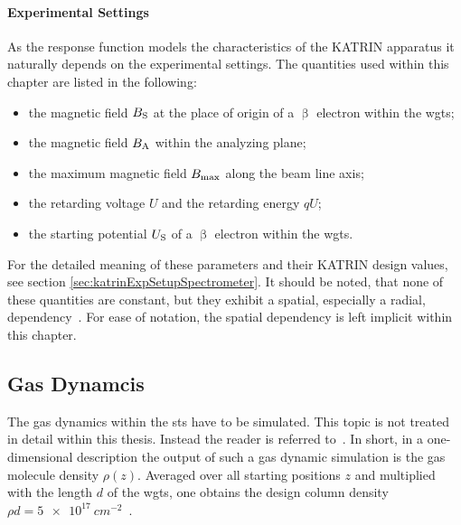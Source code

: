 \paragraph{Experimental Settings}
As the response function models the characteristics of the KATRIN apparatus it naturally depends on the experimental settings. The quantities used within this chapter are listed in the following:
\begin{itemize}
	\item the magnetic field $B_\mathrm{S}$ at the place of origin of a $\upbeta$ electron within the \gls{wgts};
	\item the magnetic field $B_\mathrm{A}$ within the analyzing plane;
	\item the maximum magnetic field $B_\mathrm{max}$ along the beam line axis;
	\item the retarding voltage $U$ and the retarding energy $qU$;
	\item the starting potential $U_\mathrm{S}$ of a $\upbeta$ electron within the \gls{wgts}.
\end{itemize}
For the detailed meaning of these parameters and their KATRIN design values, see section \ref{sec:katrinExpSetupSpectrometer}.
It should be noted, that none of these quantities are constant, but they exhibit a spatial, especially a radial, dependency~\cite{Angrik:2005ep}. For ease of notation, the spatial dependency is left implicit within this chapter.


\subsection{Gas Dynamcis}
\label{sec:intSpecModelResponseGasDynamics}
The gas dynamics within the \gls{sts} have to be simulated. This topic is not treated in detail within this thesis. Instead the reader is referred to~\cite{Hoetzel2012}. In short, in a one-dimensional description the output of such a gas dynamic simulation is the gas molecule density $\rho(z)$. Averaged over all starting positions $z$ and multiplied with the length $d$ of the \gls{wgts}, one obtains the design column density $\rho d = \SI{5e17}{cm^{-2}}$~\cite{Angrik:2005ep}.


